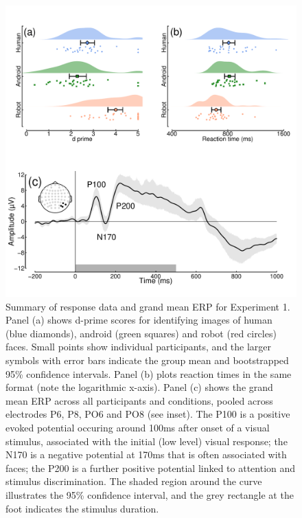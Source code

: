 \documentclass[
]{article}
\begin{document}
\begin{figure}

{\centering \includegraphics{Figures/RobotsData} 

}

\caption{Summary of response data and grand mean ERP for Experiment 1. Panel (a) shows d-prime scores for identifying images of human (blue diamonds), android (green squares) and robot (red circles) faces. Small points show individual participants, and the larger symbols with error bars indicate the group mean and bootstrapped 95\% confidence intervals. Panel (b) plots reaction times in the same format (note the logarithmic x-axis). Panel (c) shows the grand mean ERP across all participants and conditions, pooled across electrodes P6, P8, PO6 and PO8 (see inset). The P100 is a positive evoked potential occuring around 100ms after onset of a visual stimulus, associated with the initial (low level) visual response; the N170 is a negative potential at 170ms that is often associated with faces; the P200 is a further positive potential linked to attention and stimulus discrimination. The shaded region around the curve illustrates the 95\% confidence interval, and the grey rectangle at the foot indicates the stimulus duration.}\label{fig:RobotsData}
\end{figure}
\end{document}
